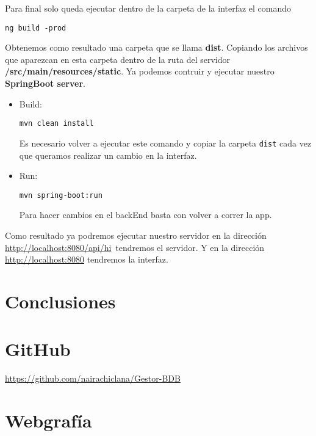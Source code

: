 \documentclass[12pt,a4paper]{article}
\begin{document}
Para final solo queda ejecutar dentro de la carpeta de la interfaz el comando \begin{verbatim}ng build -prod\end{verbatim} 

Obtenemos como resultado una carpeta que se llama \textbf{dist}. Copiando los archivos que aparezcan en esta carpeta dentro de la ruta del servidor \textbf{/src/main/resources/static}. Ya podemos contruir y ejecutar nuestro \textbf{SpringBoot server}.


\begin{itemize}
    \item Build: \begin{verbatim}mvn clean install \end{verbatim}
    Es necesario volver a ejecutar este comando y copiar la carpeta \verb|dist| cada vez que queramos realizar un cambio en la interfaz.
    \item Run: \begin{verbatim}mvn spring-boot:run \end{verbatim}
    Para hacer cambios en el backEnd basta con volver a correr la app.
\end{itemize}

Como resultado ya podremos ejecutar nuestro servidor en la dirección
 \url{http://localhost:8080/api/hi}\, tendremos el servidor. Y en la dirección \url{http://localhost:8080} tendremos la interfaz.






\newpage
\mbox{}
\newpage

\section{Conclusiones} \label{pto9}




\newpage
\mbox{}
\newpage

\section{GitHub} \label{pto10}
\url{https://github.com/nairachiclana/Gestor-BDB}
\section{Webgrafía} \label{pto11}
\end{document}
